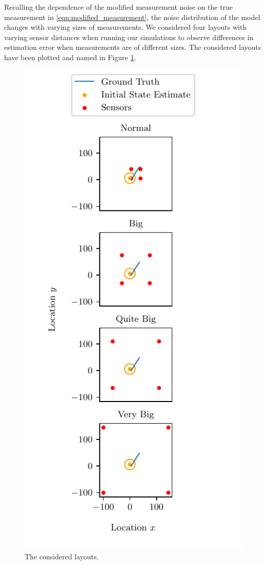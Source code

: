\documentclass[10pt,letterpaper,oneside,twocolumn,journal]{IEEEtran}
\theoremstyle{definition}
\theoremstyle{definition}
\theoremstyle{remark}
\begin{document}
Recalling the dependence of the modified measurement noise on the true measurement in \eqref{eqn:modified_measurement}, the noise distribution of the model changes with varying sizes of measurements. We considered four layouts with varying sensor distances when running our simulations to observe differences in estimation error when measurements are of different sizes. The considered layouts have been plotted and named in Figure \ref{fig:sim_layouts}.
\begin{figure}[htbp]
\centering
\includegraphics{images/layouts.pdf}
\caption{The considered layouts.}
\label{fig:sim_layouts}
\end{figure}
\end{document}
